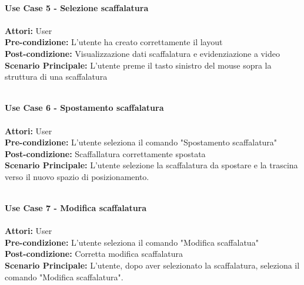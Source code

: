 \Large\textbf{}\\
\Large\textbf{Use Case 5 - Selezione scaffalatura} \\
\vspace{0.5cm}
\large\textbf{} \\
\textbf{Attori:} User\\
\textbf{Pre-condizione:} L'utente ha creato correttamente il layout \\
\textbf{Post-condizione: } Visualizzazione dati scaffalatura e evidenziazione a video\\
\textbf{Scenario Principale:}  L'utente preme il tasto sinistro del mouse sopra la struttura di una scaffalatura\\
\vspace{0.5cm}

\Large\textbf{}\\
\Large\textbf{Use Case 6 - Spostamento scaffalatura} \\
\vspace{0.5cm}
\large\textbf{} \\
\textbf{Attori:} User\\
\textbf{Pre-condizione:} L'utente seleziona il comando "Spostamento scaffalatura" \\
\textbf{Post-condizione: } Scaffallatura correttamente spostata \\
\textbf{Scenario Principale:}  L'utente selezione la scaffalatura da spostare e la trascina verso il nuovo spazio di posizionamento.\\
\vspace{0.5cm}

\Large\textbf{}\\
\Large\textbf{Use Case 7 - Modifica scaffalatura} \\
\vspace{0.5cm}
\large\textbf{} \\
\textbf{Attori:} User\\
\textbf{Pre-condizione:} L'utente seleziona il comando "Modifica scaffalatua" \\
\textbf{Post-condizione: } Corretta modifica scaffalatura\\
\textbf{Scenario Principale:}  L'utente, dopo aver selezionato la scaffalatura, seleziona il comando "Modifica scaffalatura". \\
\vspace{0.5cm}


